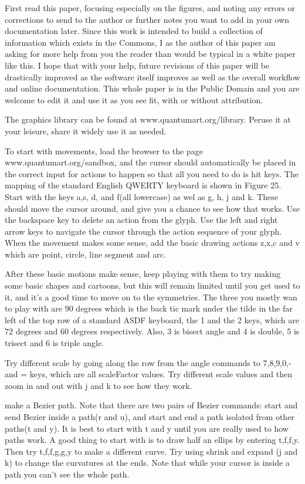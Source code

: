 \documentclass[11pt]{article}
\begin{document}
First read this paper, focusing especially on the figures, and noting any errors or corrections to send to the author or further notes you want to add in your own documentation later.  Since this work is intended to build a collection of information which exists in the Commons, I as the author of this paper am asking for more help from you the reader than would be typical in a white paper like this. I hope that with your help, future revisions of this paper will be drastically improved as the software itself improves as well as the overall workflow and online documentation.  This whole paper is in the Public Domain and you are welcome to edit it and use it as you see fit, with or without attribution.  


The graphics library can be found at www.quantumart.org/library.  Peruse it at your leisure, share it widely use it as needed.  

To start with movements, load the browser to the page www.quantumart.org/sandbox, and the cursor should automatically be placed in the correct input for actions to happen so that all you need to do is hit keys.  The mapping of the standard English QWERTY keyboard is shown in Figure 25.  Start with the keys a,s, d, and f(all lowercase) as wel as g, h, j and k.  These should move the cursor around, and give you a chance to see how that works.  Use the backspace key to delete an action from the glyph.  Use the left and right arrow keys to navigate the cursor through the action sequence of your glyph.  When the movement makes some sense, add the basic drawing actions z,x,c and v which are point, circle, line segment and arc.  

After these basic motions make sense, keep playing with them to try making some basic shapes and cartoons, but this will remain limited until you get used to it, and it's a good time to move on to the symmetries.  The three you mostly wan to play with are 90 degrees which is the back tic mark under the tilde in the far left of the top row of a standard ASDF keyboard, the 1 and the 2 keys, which are 72 degrees and 60 degrees respectively.  Also, 3 is bisect angle and 4 is double, 5 is trisect and 6 is triple angle.

Try different scale by going along the row from the angle commands to 7,8,9,0,- and = keys, which are all scaleFactor values.  Try different scale values and then zoom in and out with j and k to see how they work.  

make a Bezier path.  Note that there are two pairs of Bezier commands: start and send Bezier inside a path(r and u), and start and end a path isolated from other paths(t and y).  It is best to start with t and y until you are really used to how paths work.  A good thing to start with is to draw half an ellips by entering t,f,f,y.  Then try t,f,f,g,g,y to make a different curve.  Try using shrink and expand (j and k) to change the curvatures at the ends.  Note that while your cursor is inside a path you can't see the whole path.    
\end{document}
